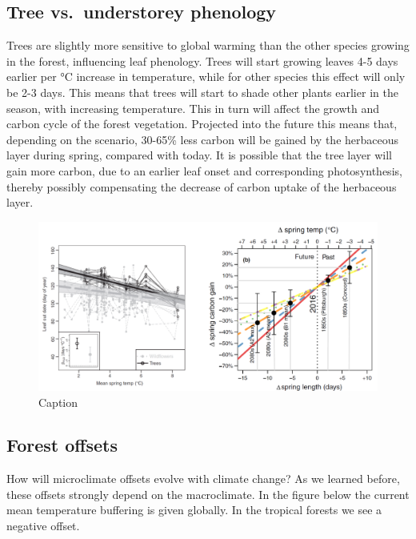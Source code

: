 \documentclass[12pt,oneside]{book}
\begin{document}
\subsection{Tree vs.~understorey
phenology}\label{tree-vs.understorey-phenology}

Trees are slightly more sensitive to global warming than the other
species growing in the forest, influencing leaf phenology. Trees will
start growing leaves 4-5 days earlier per °C increase in temperature,
while for other species this effect will only be 2-3 days. This means
that trees will start to shade other plants earlier in the season, with
increasing temperature. This in turn will affect the growth and carbon
cycle of the forest vegetation. Projected into the future this means
that, depending on the scenario, 30-65\% less carbon will be gained by
the herbaceous layer during spring, compared with today. It is possible
that the tree layer will gain more carbon, due to an earlier leaf onset
and corresponding photosynthesis, thereby possibly compensating the
decrease of carbon uptake of the herbaceous layer.

\begin{figure}

{\centering \includegraphics[width=1\linewidth]{figures/Figure1041} 

}

\caption{Caption}\label{fig:Micro41}
\end{figure}

\subsection{Forest offsets}\label{forest-offsets}

How will microclimate offsets evolve with climate change? As we learned
before, these offsets strongly depend on the macroclimate. In the figure
below the current mean temperature buffering is given globally. In the
tropical forests we see a negative offset.
\end{document}
